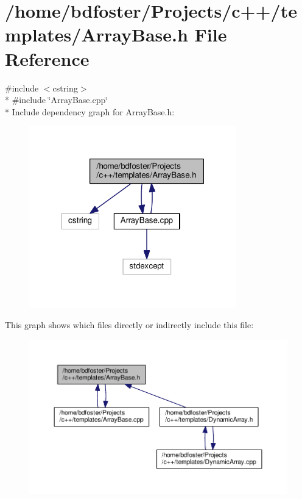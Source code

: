 \hypertarget{a00004}{\section{/home/bdfoster/\+Projects/c++/templates/\+Array\+Base.h File Reference}
\label{a00004}
}
{\ttfamily \#include $<$cstring$>$}\\*
{\ttfamily \#include \char`\"{}Array\+Base.\+cpp\char`\"{}}\\*
Include dependency graph for Array\+Base.\+h\+:
\nopagebreak
\begin{figure}[H]
\begin{center}
\leavevmode
\includegraphics[width=255pt]{da/da0/a00009}
\end{center}
\end{figure}
This graph shows which files directly or indirectly include this file\+:
\nopagebreak
\begin{figure}[H]
\begin{center}
\leavevmode
\includegraphics[width=350pt]{d7/dec/a00010}
\end{center}
\end{figure}
